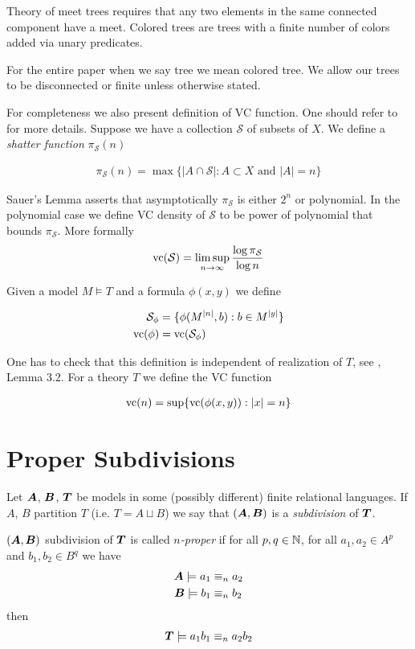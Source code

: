 \documentclass{amsart}
\DeclareMathOperator{\TT}{\boldface T}
\DeclareMathOperator{\A}{\boldface A}
\DeclareMathOperator{\B}{\boldface B}
\newcommand{\CS}{\mathcal S}
\begin{document}
Theory of meet trees requires that any two elements in the same connected component have a meet. Colored trees are trees with a finite number of colors added via unary predicates.

For the entire paper when we say tree we mean colored tree. We allow our trees to be disconnected or finite unless otherwise stated.

For completeness we also present definition of VC function.
One should refer to \cite{vc_density} for more details.
Suppose we have a collection $\CS$ of subsets of $X$. We define a \emph{shatter function} $\pi_\CS(n)$

\begin{align*}
	\pi_\CS(n) = \max \{|A \cap \CS| : A \subset X \text{ and } |A| = n\}
\end{align*}

Sauer's Lemma asserts that asymptotically $\pi_\CS$ is either $2^n$ or polynomial.
In the polynomial case we define VC density of $\CS$ to be power of polynomial that bounds $\pi_\CS$.
More formally 
\begin{align*}
	\vc(\CS) = \limsup_{n \to \infty}\frac{\log \pi_\CS}{\log n}
\end{align*}

Given a model $M \models T$ and a formula $\phi(x, y)$ we define 

\begin{align*}
	\CS_\phi &= \{\phi(M^{|n|}, b) : b \in M^{|y|}\} \\
	\vc(\phi) &=  \vc(\CS_\phi)
\end{align*}

One has to check that this definition is independent of realization of $T$, see \cite{vc_density}, Lemma 3.2. For a theory $T$ we define the VC function

\begin{align*}
	\operatorname{vc}(n) = \sup \{\operatorname{vc}(\phi(x, y)) : |x| = n\}
\end{align*}

\section{Proper Subdivisions}
\begin{Definition}
	Let $\A$, $\B$, $\TT$ be models in some (possibly different) finite relational languages. If $A$, $B$ partition $T$ (i.e. $T = A \sqcup B$) we say that $(\A, \B)$ is a \emph{subdivision} of $\TT$.
\end{Definition}

\begin{Definition}
	$(\A, \B)$ subdivision of $\TT$ is called \emph{$n$-proper} if for all $p,q \in \mathbb{N}$, for all $a_1, a_2 \in A^p$ and $b_1, b_2 \in B^q$ we have
	\begin{align*}
		\A \models a_1 &\equiv_n a_2 \\
		\B \models b_1 &\equiv_n b_2
	\end{align*}
	then
	\begin{align*}
		\TT \models a_1b_1 \equiv_n a_2b_2
	\end{align*}
\end{Definition}
\end{document}
